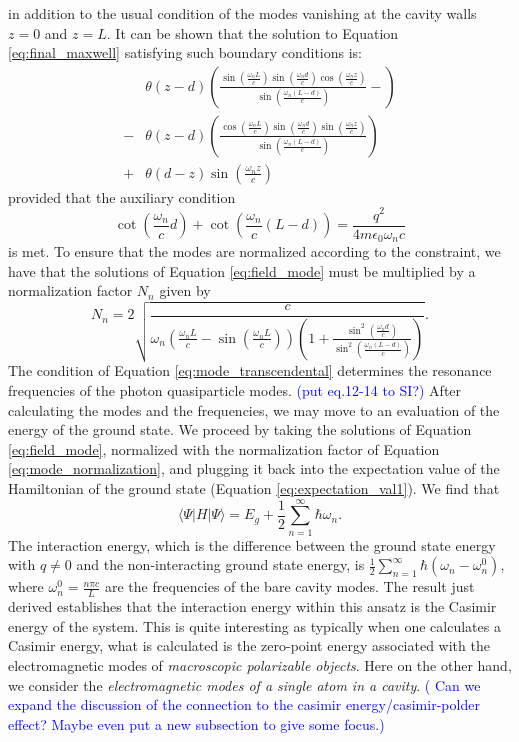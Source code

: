 \documentclass[aps,prb,twocolumn,
	groupedaddress,superscriptaddress,
	amsfonts,amssymb,amsmath,floatfix,
	citeautoscript]{revtex4-1}
\newcommand{\Jadd}[1]{\textcolor{blue}{#1}}
\begin{document}
in addition to the usual condition of the modes vanishing at the cavity walls $z=0$ and $z=L$. It can be shown that the solution to Equation \ref{eq:final_maxwell} satisfying such boundary conditions is:
\begin{align}\label{eq:field_mode}
&\theta (z-d) \left(\frac{\sin\left(\frac{\omega_nL}{c}\right)\sin\left(\frac{\omega_nd}{c}\right)\cos\left(\frac{\omega_nz}{c}\right)}{\sin\left(\frac{\omega_n(L-d)}{c}\right)}-\right) \nonumber \\ 
-&\theta (z-d) \left(\frac{\cos\left(\frac{\omega_nL}{c}\right)\sin\left(\frac{\omega_nd}{c}\right)\sin\left(\frac{\omega_nz}{c}\right)}{\sin\left(\frac{\omega_n(L-d)}{c}\right)}\right) \nonumber \\ 
+&\theta (d-z) \sin\left(\frac{\omega_n z}{c} \right)
\end{align}
provided that the auxiliary condition
\begin{equation}\label{eq:mode_transcendental}
\cot\left(\frac{\omega_n}{c}d \right)+\cot\left(\frac{\omega_n}{c}(L-d) \right) = \frac{q^2}{4m\epsilon_0\omega_nc}
\end{equation}
is met. To ensure that the modes are normalized according to the constraint, we have that the solutions of Equation \ref{eq:field_mode} must be multiplied by a normalization factor $N_n$ given by
\begin{equation}\label{eq:mode_normalization}
N_n = 2\sqrt{\frac{c}{\omega_n\left(\frac{\omega_nL}{c}-\sin\left(\frac{\omega_nL}{c}\right) \right)\left(1+\frac{\sin^2\left(\frac{\omega_nd}{c}\right)}{\sin^2\left(\frac{\omega_n(L-d)}{c}\right)} \right)}}.
\end{equation}
The condition of Equation \ref{eq:mode_transcendental} determines the resonance frequencies of the photon quasiparticle modes. \Jadd{(put eq.12-14 to SI?)} After calculating the modes and the frequencies, we may move to an evaluation of the energy of the ground state. We proceed by taking the solutions of Equation \ref{eq:field_mode}, normalized with the normalization factor of Equation \ref{eq:mode_normalization}, and plugging it back into the expectation value of the Hamiltonian of the ground state (Equation \ref{eq:expectation_val1}). We find that
\begin{equation}\label{eq:casimir}
\langle \Psi | H|\Psi\rangle = E_{g}+\frac{1}{2}\sum\limits_{n=1}^{\infty}\hbar\omega_n.
\end{equation}
The interaction energy, which is the difference between the ground state energy with $q\neq 0$ and the non-interacting ground state energy, is $\frac{1}{2}\sum\limits_{n=1}^{\infty}\hbar(\omega_n-\omega_n^0)$, where $\omega_n^0 = \frac{n\pi c}{L}$ are the frequencies of the bare cavity modes. The result just derived establishes that the interaction energy within this ansatz is the Casimir energy of the system. This is quite interesting as typically when one calculates a Casimir energy, what is calculated is the zero-point energy associated with the electromagnetic modes of \textit{macroscopic polarizable objects}. Here on the other hand, we consider the \textit{electromagnetic modes of a single atom in a cavity}. \Jadd{( Can we expand the discussion of the connection to the casimir energy/casimir-polder effect? Maybe even put a new subsection to give some focus.)}
\end{document}
